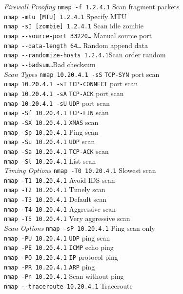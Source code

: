 \documentclass[a4paper,10pt]{article}
\begin{document}
\begin{multicols}{3}
\textit{Firewall Proofing}
\vskip-5pt
\verb|nmap -f 1.2.4.1| \dotfill Scan fragment packets\\
\verb|nmap -mtu [MTU] 1.2.4.1| \dotfill Specify MTU\\
\verb|nmap -sI [zombie] 1.2.4.1| \dotfill Scan idle zombie\\
\verb|nmap --source-port 33220…| \dotfill Manual source port\\
\verb|nmap --data-length 64…| \dotfill Random append data\\
\verb|nmap --randomize-hosts 1.2.4.1|\dotfill Scan order random\\
\verb|nmap --badsum…|\dotfill Bad checksum\\

\textit{Scan Types}
\vskip-5pt
\verb|nmap 10.20.4.1 -sS| \dotfill \verb|TCP-SYN| port scan\\
\verb|nmap 10.20.4.1 -sT| \dotfill \verb|TCP-CONNECT| port scan\\
\verb|nmap 10.20.4.1 -sA| \dotfill \verb|TCP-ACK| port scan\\
\verb|nmap 10.20.4.1 -sU| \dotfill \verb|UDP| port scan\\
\verb|nmap -Sf 10.20.4.1| \dotfill \verb|TCP-FIN| scan\\
\verb|nmap -SX 10.20.4.1| \dotfill \verb|XMAS| scan\\
\verb|nmap -Sp 10.20.4.1| \dotfill Ping scan\\
\verb|nmap -Su 10.20.4.1| \dotfill \verb|UDP| scan\\
\verb|nmap -Sa 10.20.4.1| \dotfill \verb|TCP-ACK| scan \\
\verb|nmap -Sl 10.20.4.1| \dotfill List scan\\

\textit{Timing Options}
\vskip-5pt
\verb|nmap -T0 10.20.4.1| \dotfill Slowest scan\\
\verb|nmap -T1 10.20.4.1| \dotfill Avoid IDS scan\\
\verb|nmap -T2 10.20.4.1| \dotfill Timely scan\\
\verb|nmap -T3 10.20.4.1| \dotfill Default scan\\
\verb|nmap -T4 10.20.4.1| \dotfill Aggressive scan\\
\verb|nmap -T5 10.20.4.1| \dotfill Very aggressive scan\\

\textit{Scan Options}
\vskip-5pt
\verb|nmap -sP 10.20.4.1| \dotfill Ping scan only\\
\verb|nmap -PU 10.20.4.1| \dotfill \verb|UDP| ping scan\\
\verb|nmap -PE 10.20.4.1| \dotfill \verb|ICMP| echo ping\\
\verb|nmap -PO 10.20.4.1| \dotfill \verb|IP| protocol ping\\
\verb|nmap -PR 10.20.4.1| \dotfill \verb|ARP| ping\\
\verb|nmap -Pn 10.20.4.1| \dotfill Scan without ping\\
\verb|nmap --traceroute 10.20.4.1| \dotfill Traceroute\\


\end{multicols}
\end{document}
